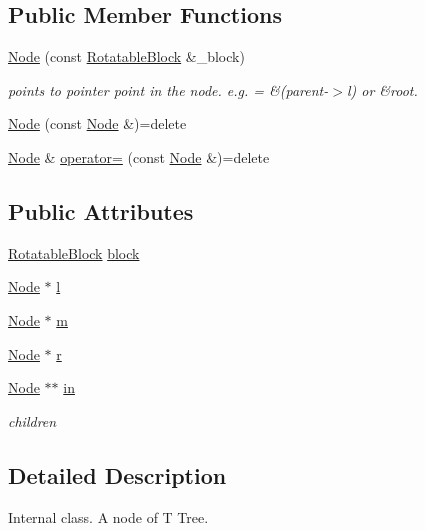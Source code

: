 \subsection*{Public Member Functions}
\begin{DoxyCompactItemize}
\item 
\hyperlink{structTTree_1_1Node_acd5412e99e3b645fafd222e15388277b}{Node} (const \hyperlink{structRotatableBlock}{Rotatable\+Block} \&\+\_\+block)
\begin{DoxyCompactList}\small\item\em points to pointer point in the node. e.\+g. = \&(parent-\/$>$l) or \&root. \end{DoxyCompactList}\item 
\hyperlink{structTTree_1_1Node_a6b9ce78ca08f3648379cf135d6796092}{Node} (const \hyperlink{structTTree_1_1Node}{Node} \&)=delete
\item 
\hyperlink{structTTree_1_1Node}{Node} \& \hyperlink{structTTree_1_1Node_a20ffdb80255bcabcdff42201b961869e}{operator=} (const \hyperlink{structTTree_1_1Node}{Node} \&)=delete
\end{DoxyCompactItemize}
\subsection*{Public Attributes}
\begin{DoxyCompactItemize}
\item 
\hyperlink{structRotatableBlock}{Rotatable\+Block} \hyperlink{structTTree_1_1Node_a100664635a89fa354373102768bd22be}{block}
\item 
\hyperlink{structTTree_1_1Node}{Node} $\ast$ \hyperlink{structTTree_1_1Node_a78f1bf067928d0e0106e1187364cc69e}{l}
\item 
\hyperlink{structTTree_1_1Node}{Node} $\ast$ \hyperlink{structTTree_1_1Node_a3f47f1068b4631b1d9eddea0300c6bee}{m}
\item 
\hyperlink{structTTree_1_1Node}{Node} $\ast$ \hyperlink{structTTree_1_1Node_adb67ed846e6787b3ff26bbcee11ee4b6}{r}
\item 
\hyperlink{structTTree_1_1Node}{Node} $\ast$$\ast$ \hyperlink{structTTree_1_1Node_ab126c67191b7e91a1eccc18a3eeadf0b}{in}
\begin{DoxyCompactList}\small\item\em children \end{DoxyCompactList}\end{DoxyCompactItemize}


\subsection{Detailed Description}
Internal class. A node of T Tree. 

